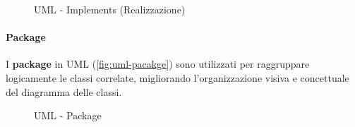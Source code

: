 \begin{figure}[h]
    \centering
    \caption{UML - Implements (Realizzazione)}
    \label{fig:uml-implements}
\end{figure}

\paragraph{Package}
I \textbf{package} in UML (\autoref{fig:uml-pacakge}) sono utilizzati per raggruppare logicamente le classi correlate, migliorando l'organizzazione visiva e concettuale del diagramma delle classi.

\begin{figure}[h]
    \centering
    \caption{UML - Package}
    \label{fig:uml-pacakge}
\end{figure}

\FloatBarrier
